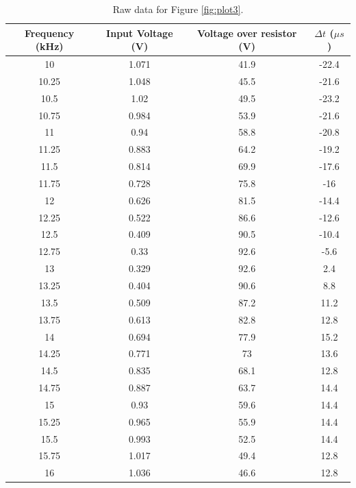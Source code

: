 \documentclass{article}
\begin{document}
\begin{table}[H]
    \centering
    \begin{tabular}{c|c|c|c}
        Frequency (kHz) & Input Voltage (V) & Voltage over resistor (V) &
        $\Delta t$ ($\mu s$) \\
        \hline
        10	&	1.071	&	41.9	&	-22.4	\\
        10.25	&	1.048	&	45.5	&	-21.6	\\
        10.5	&	1.02	&	49.5	&	-23.2	\\
        10.75	&	0.984	&	53.9	&	-21.6	\\
        11	&	0.94	&	58.8	&	-20.8	\\
        11.25	&	0.883	&	64.2	&	-19.2	\\
        11.5	&	0.814	&	69.9	&	-17.6	\\
        11.75	&	0.728	&	75.8	&	-16	\\
        12	&	0.626	&	81.5	&	-14.4	\\
        12.25	&	0.522	&	86.6	&	-12.6	\\
        12.5	&	0.409	&	90.5	&	-10.4	\\
        12.75	&	0.33	&	92.6	&	-5.6	\\
        13	&	0.329	&	92.6	&	2.4	\\
        13.25	&	0.404	&	90.6	&	8.8	\\
        13.5	&	0.509	&	87.2	&	11.2	\\
        13.75	&	0.613	&	82.8	&	12.8	\\
        14	&	0.694	&	77.9	&	15.2	\\
        14.25	&	0.771	&	73	&	13.6	\\
        14.5	&	0.835	&	68.1	&	12.8	\\
        14.75	&	0.887	&	63.7	&	14.4	\\
        15	&	0.93	&	59.6	&	14.4	\\
        15.25	&	0.965	&	55.9	&	14.4	\\
        15.5	&	0.993	&	52.5	&	14.4	\\
        15.75	&	1.017	&	49.4	&	12.8	\\
        16	&	1.036	&	46.6	&	12.8	
    \end{tabular}
    \caption{Raw data for Figure \ref{fig:plot3}.}
    \label{fig:t3}
\end{table}
\end{document}
